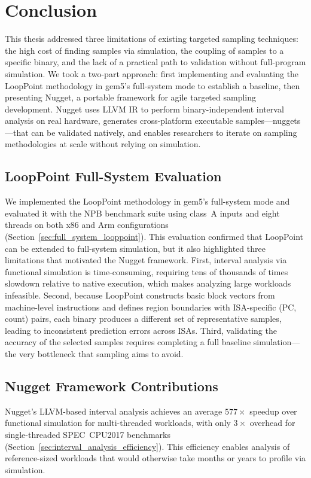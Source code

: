 \section{Conclusion}\label{sec:conclusion}

This thesis addressed three limitations of existing targeted sampling techniques: the high cost of finding samples via simulation, the coupling of samples to a specific binary, and the lack of a practical path to validation without full-program simulation.
We took a two-part approach: first implementing and evaluating the LoopPoint methodology in gem5's full-system mode to establish a baseline, then presenting Nugget, a portable framework for agile targeted sampling development.
Nugget uses LLVM IR to perform binary-independent interval analysis on real hardware, generates cross-platform executable samples---nuggets---that can be validated natively, and enables researchers to iterate on sampling methodologies at scale without relying on simulation.

\subsection{LoopPoint Full-System Evaluation}

We implemented the LoopPoint methodology in gem5's full-system mode and evaluated it with the NPB benchmark suite using class~A inputs and eight threads on both x86 and Arm configurations (Section~\ref{sec:full_system_looppoint}).
This evaluation confirmed that LoopPoint can be extended to full-system simulation, but it also highlighted three limitations that motivated the Nugget framework.
First, interval analysis via functional simulation is time-consuming, requiring tens of thousands of times slowdown relative to native execution, which makes analyzing large workloads infeasible.
Second, because LoopPoint constructs basic block vectors from machine-level instructions and defines region boundaries with ISA-specific (PC, count) pairs, each binary produces a different set of representative samples, leading to inconsistent prediction errors across ISAs.
Third, validating the accuracy of the selected samples requires completing a full baseline simulation---the very bottleneck that sampling aims to avoid.

\subsection{Nugget Framework Contributions}

Nugget's LLVM-based interval analysis achieves an average $577\times$ speedup over functional simulation for multi-threaded workloads, with only $3\times$ overhead for single-threaded SPEC~CPU2017 benchmarks (Section~\ref{sec:interval_analysis_efficiency}).
This efficiency enables analysis of reference-sized workloads that would otherwise take months or years to profile via simulation.

